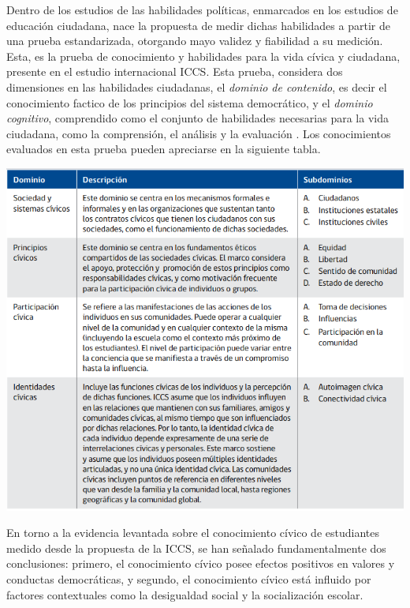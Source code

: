 \documentclass[12pt,twoside]{templates/facsothesis}
\begin{document}
Dentro de los estudios de las habilidades políticas, enmarcados en los estudios de educación ciudadana, nace la propuesta de medir dichas habilidades a partir de una prueba estandarizada, otorgando mayo validez y fiabilidad a su medición. Esta, es la prueba de conocimiento y habilidades para la vida cívica y ciudadana, presente en el estudio internacional ICCS. Esta prueba, considera dos dimensiones en las habilidades ciudadanas, el \emph{dominio de contenido}, es decir el conocimiento factico de los principios del sistema democrático, y el \emph{dominio cognitivo}, comprendido como el conjunto de habilidades necesarias para la vida ciudadana, como la comprensión, el análisis y la evaluación \citep{schulz_Estudio_2011}. Los conocimientos evaluados en esta prueba pueden apreciarse en la siguiente tabla.

\begin{center}\includegraphics[width=0.8\linewidth]{images/Contenidos} \end{center}

En torno a la evidencia levantada sobre el conocimiento cívico de estudiantes medido desde la propuesta de la ICCS, se han señalado fundamentalmente dos conclusiones: primero, el conocimiento cívico posee efectos positivos en valores y conductas democráticas, y segundo, el conocimiento cívico está influido por factores contextuales como la desigualdad social y la socialización escolar.
\end{document}
